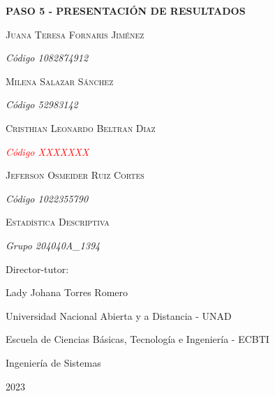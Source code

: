 \begin{titlepage}
	\centering
	{\bfseries\LARGE PASO 5 - PRESENTACIÓN DE RESULTADOS\par}
	\vspace{2cm}
	{\scshape Juana Teresa Fornaris Jiménez \par}
	{\itshape C\'odigo 1082874912 \par}
	{\scshape Milena Salazar Sánchez \par}
	{\itshape C\'odigo 52983142 \par}
	{\scshape Cristhian Leonardo Beltran Diaz \par}
	{\itshape \textcolor{red}{C\'odigo XXXXXXX}  \par}
	{\scshape Jeferson Osmeider Ruiz Cortes \par}
	{\itshape C\'odigo 1022355790 \par}
	\vspace{1cm}
	{\scshape\Large Estadística Descriptiva \par}
	{\itshape\Large Grupo 204040A\_1394 \par}
	\vspace{1cm}
	{\Large Director-tutor: \par}
	{\Large Lady Johana Torres Romero \par}
	\vspace{1cm}
	{\Large Universidad Nacional Abierta y a Distancia - UNAD \par
	Escuela de Ciencias Básicas, Tecnología e Ingeniería - ECBTI\par
	Ingeniería de Sistemas\par}
	{\Large 2023 \par}
\end{titlepage}